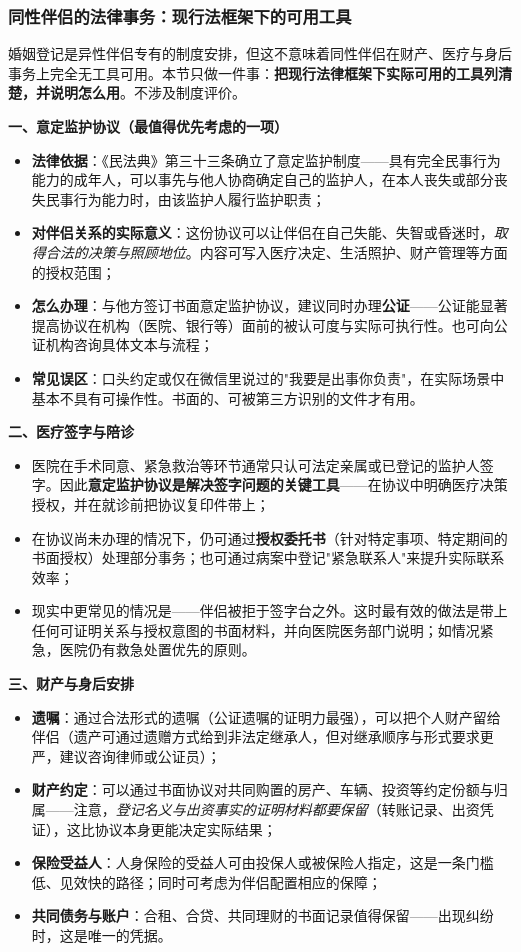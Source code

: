 \subsubsection{同性伴侣的法律事务：现行法框架下的可用工具}

婚姻登记是异性伴侣专有的制度安排，但这不意味着同性伴侣在财产、医疗与身后事务上完全无工具可用。本节只做一件事：\textbf{把现行法律框架下实际可用的工具列清楚，并说明怎么用}。不涉及制度评价。

\textbf{一、意定监护协议（最值得优先考虑的一项）}
\begin{itemize}
\item \textbf{法律依据}：《民法典》第三十三条确立了意定监护制度——具有完全民事行为能力的成年人，可以事先与他人协商确定自己的监护人，在本人丧失或部分丧失民事行为能力时，由该监护人履行监护职责；
\item \textbf{对伴侣关系的实际意义}：这份协议可以让伴侣在自己失能、失智或昏迷时，\emph{取得合法的决策与照顾地位}。内容可写入医疗决定、生活照护、财产管理等方面的授权范围；
\item \textbf{怎么办理}：与他方签订书面意定监护协议，建议同时办理\textbf{公证}——公证能显著提高协议在机构（医院、银行等）面前的被认可度与实际可执行性。也可向公证机构咨询具体文本与流程；
\item \textbf{常见误区}：口头约定或仅在微信里说过的"我要是出事你负责"，在实际场景中基本不具有可操作性。书面的、可被第三方识别的文件才有用。
\end{itemize}

\textbf{二、医疗签字与陪诊}
\begin{itemize}
\item 医院在手术同意、紧急救治等环节通常只认可法定亲属或已登记的监护人签字。因此\textbf{意定监护协议是解决签字问题的关键工具}——在协议中明确医疗决策授权，并在就诊前把协议复印件带上；
\item 在协议尚未办理的情况下，仍可通过\textbf{授权委托书}（针对特定事项、特定期间的书面授权）处理部分事务；也可通过病案中登记"紧急联系人"来提升实际联系效率；
\item 现实中更常见的情况是——伴侣被拒于签字台之外。这时最有效的做法是带上任何可证明关系与授权意图的书面材料，并向医院医务部门说明；如情况紧急，医院仍有救急处置优先的原则。
\end{itemize}

\textbf{三、财产与身后安排}
\begin{itemize}
\item \textbf{遗嘱}：通过合法形式的遗嘱（公证遗嘱的证明力最强），可以把个人财产留给伴侣（遗产可通过遗赠方式给到非法定继承人，但对继承顺序与形式要求更严，建议咨询律师或公证员）；
\item \textbf{财产约定}：可以通过书面协议对共同购置的房产、车辆、投资等约定份额与归属——注意，\emph{登记名义与出资事实的证明材料都要保留}（转账记录、出资凭证），这比协议本身更能决定实际结果；
\item \textbf{保险受益人}：人身保险的受益人可由投保人或被保险人指定，这是一条门槛低、见效快的路径；同时可考虑为伴侣配置相应的保障；
\item \textbf{共同债务与账户}：合租、合贷、共同理财的书面记录值得保留——出现纠纷时，这是唯一的凭据。
\end{itemize}

